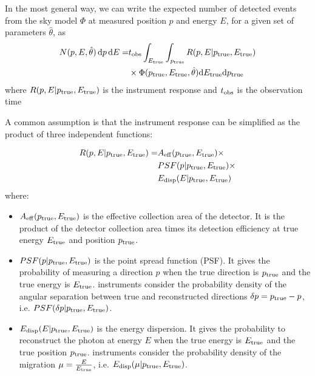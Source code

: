 \documentclass[traditabstract, longauth]{aa}
\begin{document}

In the most general way, we can write the expected number of detected events from the sky model $\Phi$ at measured position $p$ and energy $E$, for
a given set of parameters $\hat{\theta}$, as
\begin{align}
   N(p, E, \hat{\theta})\,{\rm d}p\,{\rm d}E = &t_{\rm obs} \int_{E_{\rm true}} \int_{p_{\rm true}}  R(p, E|p_{\rm true}, E_{\rm true})\\
   &\times \Phi(p_{\rm true}, E_{\rm true}, \hat{\theta} ) {\rm d}E_{\rm true} {\rm d}p_{\rm true}
\end{align}
where $R(p, E| p_{\rm true}, E_{\rm true})$ is the instrument response and $t_{\rm obs}$ is the observation time

A common assumption is that the instrument response can be simplified as the product
of three independent functions:

\begin{align}
   R(p, E|p_{\rm true}, E_{\rm true}) = &A_{\rm eff}(p_{\rm true}, E_{\rm true}) \times\\
    &PSF(p|p_{\rm true}, E_{\rm true}) \times\\
    &E_{\rm disp}(E|p_{\rm true}, E_{\rm true})
\end{align}
where:
\begin{itemize}
\item $A_{\rm eff}(p_{\rm true}, E_{\rm true})$ is the effective collection area of the detector. It is the product
  of the detector collection area times its detection efficiency at true energy $E_{\rm true}$ and position $p_{\rm true}$.
\item $PSF(p|p_{\rm true}, E_{\rm true})$ is the point spread function (PSF). It gives the probability of
  measuring a direction $p$ when the true direction is $p_{\rm true}$ and the true energy is $E_{\rm true}$.
  \gammaray instruments consider the probability density of the angular separation between true and reconstructed directions
  $\delta p = p_{\rm true} - p$, i.e. $PSF(\delta p|p_{\rm true}, E_{\rm true})$.
\item $E_{\rm disp}(E|p_{\rm true}, E_{\rm true})$ is the energy dispersion. It gives the probability to
  reconstruct the photon at energy $E$ when the true energy is $E_{\rm true}$ and the true position $p_{\rm true}$.
  \gammaray instruments consider the probability density of the migration $\mu=\frac{E}{E_{\rm true}}$,
  i.e. $E_{\rm disp}(\mu|p_{\rm true}, E_{\rm true})$.
\end{itemize}
\end{document}
